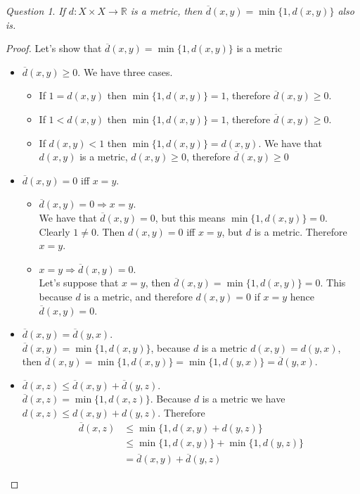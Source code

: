 \documentclass{article}
\theoremstyle{definition}
\theoremstyle{remark}
\theoremstyle{remark}
\newtheorem{question}{Question}
\theoremstyle{example}
\begin{document}
\begin{question}
\textit{If $d : X \times X \to \mathbb{R}$ is a metric, then $\overline{d}(x,y) = \min{\{1,d(x,y)\}}$ also is.}
\end{question}
\begin{proof}
Let's show that $\overline{d}(x,y) = \min{\{1,d(x,y)\}}$ is a metric
\begin{itemize}
    \item $\overline{d}(x,y) \geq 0$. We have three cases.
    \begin{itemize}
        \item If $1 = d(x,y)$ then $\min{\{1,d(x,y)\}} = 1$, therefore $\overline{d}(x,y) \geq 0$.
        \item If $1 < d(x,y)$ then $\min{\{1,d(x,y)\}} = 1$, therefore $\overline{d}(x,y) \geq 0$.
        \item If $d(x,y) < 1$ then $\min{\{1,d(x,y)\}} = d(x,y)$. We have that $d(x,y)$ is a metric, $d(x,y) \geq 0$, therefore $\overline{d}(x,y) \geq 0$
    \end{itemize}
    \item $\overline{d}(x,y) = 0$ iff $x = y$.
    \begin{itemize}
        \item $\overline{d}(x,y) = 0 \Rightarrow x = y$. \\
        
        We have that $\overline{d}(x,y) = 0$, but this means $\min{\{1,d(x,y)\}} = 0$. Clearly $1 \neq 0$. Then $d(x,y) = 0$ iff $x = y$, but $d$ is a metric. Therefore $x = y$.
        \item $x = y \Rightarrow \overline{d}(x,y) = 0$. \\
        
        Let's suppose that $x = y$, then $\overline{d}(x,y) = \min{\{1,d(x,y)\}} = 0$. This because $d$ is a metric, and therefore $d(x,y) = 0$ if $x = y$ hence $\overline{d}(x,y) = 0$.
    \end{itemize}
    \item $\overline{d}(x,y) = \overline{d}(y,x)$. \\
    
    $\overline{d}(x,y) = \min{\{1,d(x,y)\}}$, because $d$ is a metric $d(x,y) = d(y,x)$, then $\overline{d}(x,y) = \min{\{1,d(x,y)\}} = \min{\{1,d(y,x)\}} = \overline{d}(y,x)$. \\
    
    \item $\overline{d}(x,z) \leq \overline{d}(x,y) + \overline{d}(y,z)$. \\
    
    $\overline{d}(x,z) = \min{\{1,d(x,z)\}}$. Because $d$ is a metric we have $d(x,z) \leq d(x,y) + d(y,z)$. Therefore
    \begin{align*}
        \overline{d}(x,z) &\leq \min{\{1,d(x,y) + d(y,z)\}} \\
        &\leq \min{\{1,d(x,y)\}} + \min{\{1,d(y,z)\}} \\
        &= \overline{d}(x,y) + \overline{d}(y,z)
    \end{align*}
\end{itemize} 
\end{proof}
\end{document}
